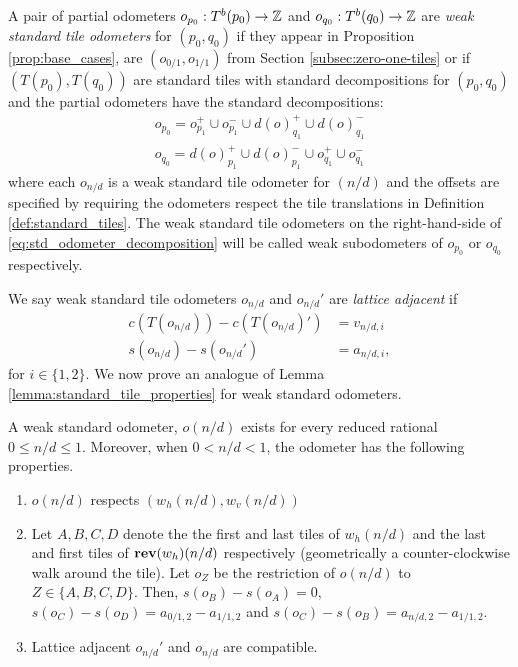 \documentclass[12pt]{amsart}
\begin{document}
\begin{definition} \label{def:weak_standard_odometers}
	A pair of partial odometers $o_{p_0}:T^b(p_0) \to \mathbb{Z}$ and $o_{q_0}:T^b(q_0) \to \mathbb{Z}$ 
	are {\it weak standard tile odometers} for $(p_0, q_0)$ if they appear in Proposition \ref{prop:base_cases}, are $(o_{0/1}, o_{1/1})$ from Section \ref{subsec:zero-one-tiles} or if $(T(p_0), T(q_0))$ are standard tiles with standard decompositions
	for $(p_0,q_0)$ and the partial odometers have the standard decompositions:
	\begin{equation} \label{eq:std_odometer_decomposition}
	\begin{aligned}
	o_{p_0} = o_{p_1}^+ \cup o_{p_1}^- \cup d(o)_{q_1}^+ \cup d(o)_{q_1}^- \\
	o_{q_0} =  d(o)_{p_1}^+ \cup d(o)_{p_1}^- \cup o_{q_1}^+ \cup o_{q_1}^- 
	\end{aligned}
	\end{equation}
	where each $o_{n/d}$ is a weak standard tile odometer for $(n/d)$ and the offsets are specified by requiring the odometers respect the tile translations in Definition \ref{def:standard_tiles}. The weak standard tile odometers on the right-hand-side of \eqref{eq:std_odometer_decomposition} will be called weak subodometers of $o_{p_0}$ or $o_{q_0}$ respectively. 
\end{definition}


We say weak standard tile odometers $o_{n/d}$ and $o_{n/d}'$ are {\it lattice adjacent} if 
\begin{align*}
c(T(o_{n/d})) - c(T(o_{n/d})') &=  v_{n/d,i} \\
s(o_{n/d}) - s(o_{n/d}') &= a_{n/d,i},
\end{align*}
for $i \in \{1,2\}$. We now prove an analogue of Lemma \ref{lemma:standard_tile_properties}
for weak standard odometers.  

\begin{lemma} \label{lemma:weak_standard_odometer_properties}
	A weak standard odometer, $o(n/d)$ exists for every reduced rational $0 \leq n/d \leq 1$. Moreover, 
	when $0 < n/d < 1$, the odometer has the following properties. 
	\begin{enumerate}[label=(\alph*)]
		\item $o(n/d)$ respects $(w_{h}(n/d), w_v(n/d))$
		\item Let $A,B,C,D$ denote the the first and last tiles of $w_h(n/d)$ and the last and first tiles of $\mathop{\bf rev}(w_h)(n/d)$
		respectively (geometrically a counter-clockwise walk around the tile). Let $o_{Z}$ be the restriction of $o(n/d)$ to $Z \in \{A,B,C,D\}$. Then, $s(o_B) - s(o_A) = 0$, $s(o_C) - s(o_D) = a_{0/1,2}-a_{1/1,2}$ and $s(o_C) - s(o_B)= a_{n/d,2} - a_{1/1,2}$.
		\item Lattice adjacent $o_{n/d}'$ and $o_{n/d}$ are compatible. 
	\end{enumerate}
\end{lemma}
	
\end{document}
